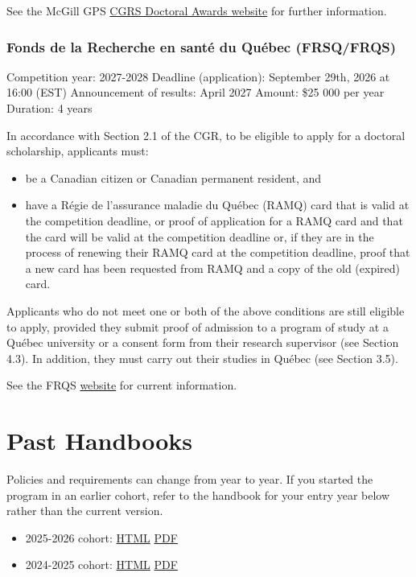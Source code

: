 \documentclass[
  letterpaper,
  DIV=11,
  numbers=noendperiod]{scrreprt}
\providecommand{\tightlist}{%
  \setlength{\itemsep}{0pt}\setlength{\parskip}{0pt}}
\begin{document}
See the McGill GPS
\href{https://www.mcgill.ca/gps/funding/fac-staff/awards/tri-agency-cgrs-d-cihr-nserc-sshrc}{CGRS
Doctoral Awards website} for further information.

\subsection{Fonds de la Recherche en santé du Québec
(FRSQ/FRQS)}\label{fonds-de-la-recherche-en-santuxe9-du-quuxe9bec-frsqfrqs}

Competition year: 2027-2028 Deadline (application): September 29th, 2026
at 16:00 (EST) Announcement of results: April 2027 Amount: \$25 000 per
year Duration: 4 years

In accordance with Section 2.1 of the CGR, to be eligible to apply for a
doctoral scholarship, applicants must:

\begin{itemize}
\tightlist
\item
  be a Canadian citizen or Canadian permanent resident, and
\item
  have a Régie de l'assurance maladie du Québec (RAMQ) card that is
  valid at the competition deadline, or proof of application for a RAMQ
  card and that the card will be valid at the competition deadline or,
  if they are in the process of renewing their RAMQ card at the
  competition deadline, proof that a new card has been requested from
  RAMQ and a copy of the old (expired) card.
\end{itemize}

Applicants who do not meet one or both of the above conditions are still
eligible to apply, provided they submit proof of admission to a program
of study at a Québec university or a consent form from their research
supervisor (see Section 4.3). In addition, they must carry out their
studies in Québec (see Section 3.5).

See the FRQS
\href{https://frq.gouv.qc.ca/en/program/doctoral-research-scholarship-2027-2028-b2-regular-component-and-re-entering-research-component/}{website}
for current information.


\chapter{Past Handbooks}\label{past-handbooks}

Policies and requirements can change from year to year. If you started
the program in an earlier cohort, refer to the handbook for your entry
year below rather than the current version.

\begin{itemize}
\tightlist
\item
  2025-2026 cohort: \href{archive/2025-2026/index.html}{HTML} \textbar{}
  \href{archive/2025-2026/phd-handbook.pdf}{PDF}
\item
  2024-2025 cohort: \href{archive/2024-2025/index.html}{HTML} \textbar{}
  \href{archive/2024-2025/phd-handbook.pdf}{PDF}
\end{itemize}
\end{document}
